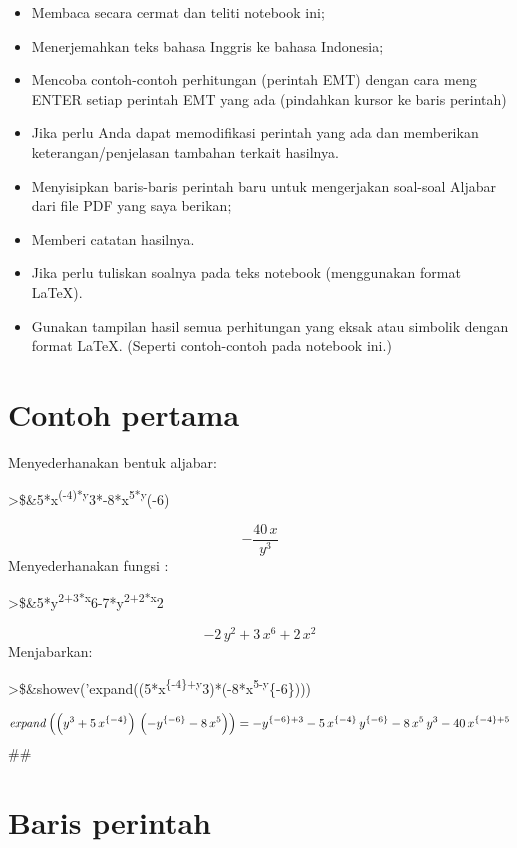 \documentclass[
]{book}
\begin{document}
\begin{itemize}
\item
  Membaca secara cermat dan teliti notebook ini;
\item
  Menerjemahkan teks bahasa Inggris ke bahasa Indonesia;
\item
  Mencoba contoh-contoh perhitungan (perintah EMT) dengan cara meng ENTER setiap perintah EMT yang ada (pindahkan kursor ke baris perintah)
\item
  Jika perlu Anda dapat memodifikasi perintah yang ada dan memberikan keterangan/penjelasan tambahan terkait hasilnya.
\item
  Menyisipkan baris-baris perintah baru untuk mengerjakan soal-soal Aljabar dari file PDF yang saya berikan;
\item
  Memberi catatan hasilnya.
\item
  Jika perlu tuliskan soalnya pada teks notebook (menggunakan format LaTeX).
\item
  Gunakan tampilan hasil semua perhitungan yang eksak atau simbolik dengan format LaTeX. (Seperti contoh-contoh pada notebook ini.)
\end{itemize}

\section{Contoh pertama}\label{contoh-pertama}

Menyederhanakan bentuk aljabar:

\textgreater\$\&5*x\textsuperscript{(-4)*y}3*-8*x\textsuperscript{5*y}(-6)

\[-\frac{40\,x}{y^3}\]Menyederhanakan fungsi :

\textgreater\$\&5*y\textsuperscript{2+3*x}6-7*y\textsuperscript{2+2*x}2

\[-2\,y^2+3\,x^6+2\,x^2\]Menjabarkan:

\textgreater\$\&showev('expand((5*x\textsuperscript{\{-4\}+y}3)*(-8*x\textsuperscript{5-y}\{-6\})))

\[{\it expand}\left(\left(y^3+5\,x^{\left \{-4 \right \}}\right)\,
 \left(-y^{\left \{-6 \right \}}-8\,x^5\right)\right)=-y^{\left \{-6
  \right \}+3}-5\,x^{\left \{-4 \right \}}\,y^{\left \{-6 \right \}}-
 8\,x^5\,y^3-40\,x^{\left \{-4 \right \}+5}\]\#\#

\section{Baris perintah}\label{baris-perintah}
\end{document}
